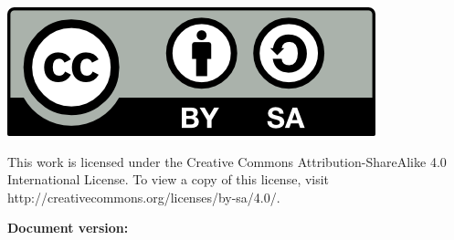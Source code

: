 \documentclass[a4paper,oneside,12pt]{memoir} %
\begin{document}


\pagestyle{plain} %



\clearpage
\begin{minipage}[c]{0.25\textwidth}
	\includegraphics[width=\textwidth]{./figures/by-sa}
\end{minipage}
\begin{minipage}[c]{0.7\textwidth}
	This work is licensed under the Creative Commons Attribution-ShareAlike 4.0 International License. To view a copy of this license, visit http://creativecommons.org/licenses/by-sa/4.0/.
\end{minipage}

\vfill
\begin{center}
	\textbf{Document version: \vhCurrentVersion}
\end{center}


\frontmatter
\printnoidxglossaries
\cleardoublepage
\listoftodos
\clearpage
\tableofcontents

\mainmatter

\backmatter
%

\end{document}
